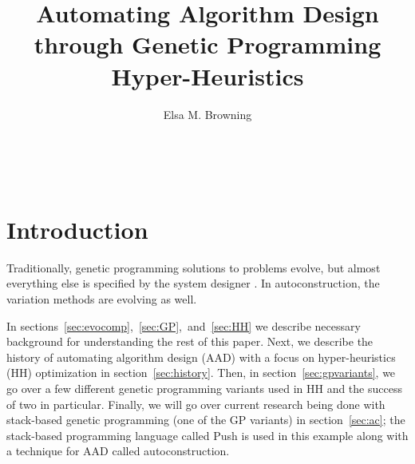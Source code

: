 \documentclass{sig-alternate}
\begin{document}

\title{Automating Algorithm Design through Genetic Programming Hyper-Heuristics}


\author{
\alignauthor
Elsa M. Browning\\
	\\
	\\
	\\
}

\maketitle
\begin{abstract}
\end{abstract}


\section{Introduction}
\label{sec:introduction}

Traditionally, genetic programming solutions to problems evolve, but almost everything else is specified by the system designer \cite{spector:2016}. In autoconstruction, the variation methods are evolving as well.

In sections~\ref{sec:evocomp},~\ref{sec:GP},~and~\ref{sec:HH} we describe necessary background for understanding the rest of this paper. Next, we describe the history of automating algorithm design (AAD) with a focus on hyper-heuristics (HH) optimization in section~\ref{sec:history}. Then, in section~\ref{sec:gpvariants}, we go over a few different genetic programming variants used in HH and the success of two in particular. Finally, we will go over current research being done with stack-based genetic programming (one of the GP variants) in section~\ref{sec:ac}; the stack-based programming language called Push is used in this example along with a technique for AAD called autoconstruction.
\end{document}
